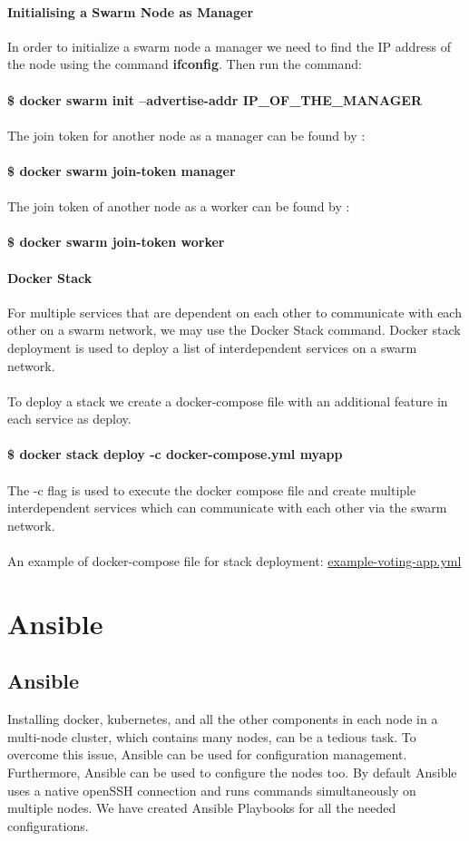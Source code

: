 \documentclass[12pt]{report}
\begin{document}
\subsubsection{Initialising a Swarm Node as Manager}
In order to initialize a swarm node a manager we need to find the IP address of the node using the command \textbf{ifconfig}. Then run the command:\\\\
\textbf{\$ docker swarm init --advertise-addr IP\_OF\_THE\_MANAGER}\\\\
The join token for another node as a manager can be found by :\\\\
\textbf{\$ docker swarm join-token manager\\\\}
The join token of another node as a worker can be found by :\\\\
\textbf{\$ docker swarm join-token worker}
\subsubsection{Docker Stack}
For multiple services that are dependent on each other to communicate with each other on a swarm network, we may use the Docker Stack command. Docker stack deployment is used to deploy a list of interdependent services on a swarm network.\\\\
To deploy a stack we create a docker-compose file with an additional feature in each service as deploy.\\\\
\textbf{\$ docker stack deploy -c docker-compose.yml myapp}\\\\
The -c flag is used to execute the docker compose file and create multiple interdependent services which can communicate with each other via the swarm network.\\\\
An example of docker-compose file for stack deployment: \href{https://drive.google.com/file/d/1t3MwMzXrjDNgrXTeLmwiEe5Hj0q6pueq/view?usp=sharing}{example-voting-app.yml}
\chapter{Ansible}
\section{Ansible}
Installing docker, kubernetes, and all the other components in each node in a multi-node cluster, which contains many nodes, can be a tedious task. To overcome this issue, Ansible can be used for configuration management. Furthermore, Ansible can be used to configure the nodes too. By default Ansible uses a native openSSH connection and runs commands simultaneously on multiple nodes. We have created Ansible Playbooks for all the needed configurations.
\end{document}
